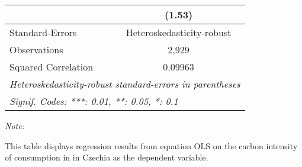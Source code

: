\begin{table}[htbp!]
\begin{adjustbox}{width = 1\textwidth, max height = 0.95\textheight, center}
\begin{threeparttable}[b]
\begin{tabular}{lc}
                                & (1.53)\\   
            \midrule 
            Standard-Errors     & Heteroskedasticity-robust \\   
            Observations        & 2,929\\  
            Squared Correlation & 0.09963\\  
            \midrule \midrule
            \multicolumn{2}{l}{\emph{Heteroskedasticity-robust standard-errors in parentheses}}\\
            \multicolumn{2}{l}{\emph{Signif. Codes: ***: 0.01, **: 0.05, *: 0.1}}\\
         \end{tabular}
         
         \begin{tablenotes}\item \medskip \textit{Note:}
            \item This table displays regression results from equation OLS on the carbon intensity of consumption in  in Czechia as the dependent variable. 
         \end{tablenotes}
      \end{threeparttable}
   \end{adjustbox}
\end{table}


